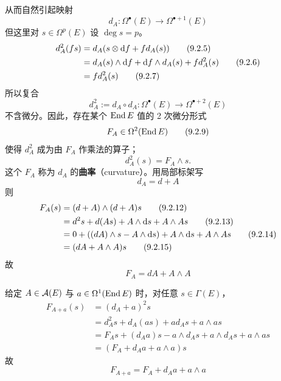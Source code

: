 从而自然引起映射
\begin{equation}
  d_A\colon \Omega^\bullet(E) \to \Omega^{\bullet+1}(E)
  \tag{9.2.4}
\end{equation}
但这里对 $s\in\Omega^p(E)$ 设 $\deg s = p$。
\begin{align}
  d_A^2(fs) &= d_A(s\otimes \mathrm{d} f + f d_A(s))
  \tag{9.2.5}\\
  &= d_A(s)\wedge \mathrm{d} f + \mathrm{d} f\wedge d_A(s) + f d_A^2(s)
  \tag{9.2.6}\\
  &= f d_A^2(s)
  \tag{9.2.7}
\end{align}
所以复合
\begin{equation}
  d_A^2 := d_A\circ d_A\colon \Omega^\bullet(E) \to \Omega^{\bullet+2}(E)
  \tag{9.2.8}
\end{equation}
不含微分。因此，存在某个 $\operatorname{End} E$ 值的 2 次微分形式
\begin{equation}
  F_A \in \Omega^2(\operatorname{End} E)
  \tag{9.2.9}
\end{equation}
使得 $d_A^2$ 成为由 $F_A$ 作乘法的算子；
\begin{equation}
  d_A^2(s) = F_A\wedge s.
  \tag{9.2.10}
\end{equation}
这个 $F_A$ 称为 $d_A$ 的\textbf{曲率}（curvature）。用局部标架写
\begin{equation}
  d_A = d + A
  \tag{9.2.11}
\end{equation}
则
\begin{align}
  F_A(s) &= (d+A)\wedge(d+A)s
  \tag{9.2.12}\\
  &= d^2 s + d(As) + A\wedge \mathrm{d} s + A\wedge As
  \tag{9.2.13}\\
  &= 0 + ((dA)\wedge s - A\wedge \mathrm{d} s) + A\wedge \mathrm{d} s + A\wedge As
  \tag{9.2.14}\\
  &= (dA + A\wedge A)s
  \tag{9.2.15}
\end{align}
故
\begin{equation}
  F_A = dA + A\wedge A
  \tag{9.2.16}
\end{equation}


给定 $A\in\mathcal{A}(E)$ 与 $a\in\Omega^1(\operatorname{End} E)$ 时，对任意 $s\in\Gamma(E)$，
\begin{align}
  F_{A+a}(s) &= (d_A+a)^2 s
  \tag{9.2.17}\\
  &= d_A^2 s + d_A(as) + a d_A s + a\wedge as
  \tag{9.2.18}\\
  &= F_A s + (d_A a)s - a\wedge d_A s + a\wedge d_A s + a\wedge as
  \tag{9.2.19}\\
  &= (F_A + d_A a + a\wedge a)s
  \tag{9.2.20}
\end{align}
故
\begin{equation}
  F_{A+a} = F_A + d_A a + a\wedge a
  \tag{9.2.21}
\end{equation}

